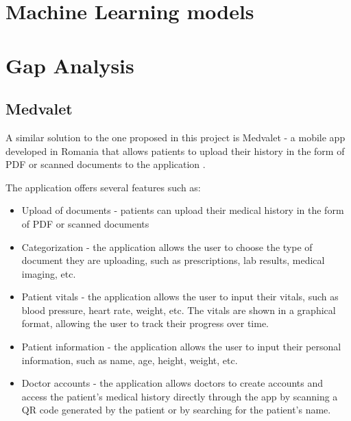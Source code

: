 \section{Machine Learning models}

\section{Gap Analysis}

\subsection{Medvalet}

A similar solution to the one proposed in this project is Medvalet - a mobile app developed in Romania that allows patients to upload their history in the form of PDF or scanned documents to the application \parencite{medvalet}. 

The application offers several features such as:
\begin{itemize}
    \item Upload of documents - patients can upload their medical history in the form of PDF or scanned documents
    \item Categorization - the application allows the user to choose the type of document they are uploading, such as prescriptions, lab results, medical imaging, etc.
    \item Patient vitals - the application allows the user to input their vitals, such as blood pressure, heart rate, weight, etc. The vitals are shown in a graphical format, allowing the user to track their progress over time.
    \item Patient information - the application allows the user to input their personal information, such as name, age, height, weight, etc.
    \item Doctor accounts - the application allows doctors to create accounts and access the patient's medical history directly through the app by scanning a QR code generated by the patient or by searching for the patient's name.
\end{itemize}

